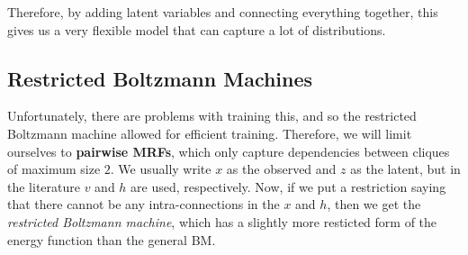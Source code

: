 \documentclass{article}
\begin{document}
  Therefore, by adding latent variables and connecting everything together, this gives us a very flexible model that can capture a lot of distributions.  

\subsection{Restricted Boltzmann Machines} 

  Unfortunately, there are problems with training this, and so the restricted Boltzmann machine allowed for efficient training. Therefore, we will limit ourselves to \textbf{pairwise MRFs}, which only capture dependencies between cliques of maximum size $2$. We usually write $x$ as the observed and $z$ as the latent, but in the literature $v$ and $h$ are used, respectively. Now, if we put a restriction saying that there cannot be any intra-connections in the $x$ and $h$, then we get the \textit{restricted Boltzmann machine}, which has a slightly more resticted form of the energy function than the general BM. 
\end{document}
